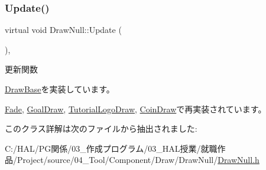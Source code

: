 \subsubsection{\texorpdfstring{Update()}{Update()}}
{\footnotesize\ttfamily virtual void Draw\+Null\+::\+Update (\begin{DoxyParamCaption}{ }\end{DoxyParamCaption})\hspace{0.3cm}{\ttfamily [inline]}, {\ttfamily [virtual]}}



更新関数 



\mbox{\hyperlink{class_draw_base_af64b19d08a58927a789e2fb8a11cf524}{Draw\+Base}}を実装しています。



\mbox{\hyperlink{class_fade_a1579b5b9020344a1131ea11c15f2c0bd}{Fade}}, \mbox{\hyperlink{class_goal_draw_a6e003277ed44eb9c800a616b6acbcb20}{Goal\+Draw}}, \mbox{\hyperlink{class_tutorial_logo_draw_af69405fcc8b20684a19e982726d93ffa}{Tutorial\+Logo\+Draw}}, \mbox{\hyperlink{class_coin_draw_a6157b17bf1706b85156aad0d88acfd7e}{Coin\+Draw}}で再実装されています。



このクラス詳解は次のファイルから抽出されました\+:\begin{DoxyCompactItemize}
\item 
C\+:/\+H\+A\+L/\+P\+G関係/03\+\_\+作成プログラム/03\+\_\+\+H\+A\+L授業/就職作品/\+Project/source/04\+\_\+\+Tool/\+Component/\+Draw/\+Draw\+Null/\mbox{\hyperlink{_draw_null_8h}{Draw\+Null.\+h}}\end{DoxyCompactItemize}
